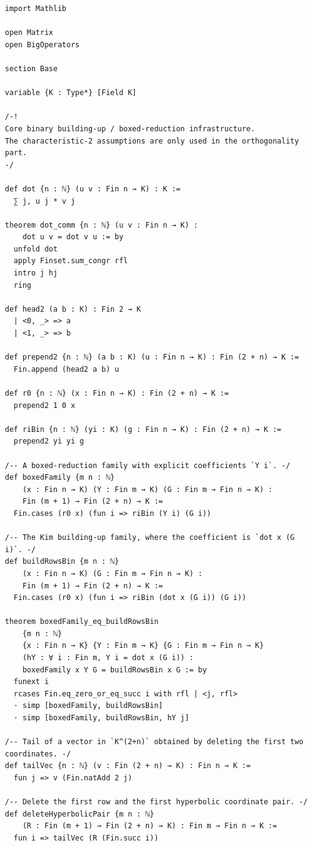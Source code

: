 \documentclass[12pt]{article}
\begin{document}
\begin{lstlisting}[caption={Lean verification for Theorem~\ref{thm:CZ_Kim_Lagrangian}.}]
import Mathlib

open Matrix
open BigOperators

section Base

variable {K : Type*} [Field K]

/-!
Core binary building-up / boxed-reduction infrastructure.
The characteristic-2 assumptions are only used in the orthogonality part.
-/

def dot {n : ℕ} (u v : Fin n → K) : K :=
  ∑ j, u j * v j

theorem dot_comm {n : ℕ} (u v : Fin n → K) :
    dot u v = dot v u := by
  unfold dot
  apply Finset.sum_congr rfl
  intro j hj
  ring

def head2 (a b : K) : Fin 2 → K
  | <0, _> => a
  | <1, _> => b

def prepend2 {n : ℕ} (a b : K) (u : Fin n → K) : Fin (2 + n) → K :=
  Fin.append (head2 a b) u

def r0 {n : ℕ} (x : Fin n → K) : Fin (2 + n) → K :=
  prepend2 1 0 x

def riBin {n : ℕ} (yi : K) (g : Fin n → K) : Fin (2 + n) → K :=
  prepend2 yi yi g

/-- A boxed-reduction family with explicit coefficients `Y i`. -/
def boxedFamily {m n : ℕ}
    (x : Fin n → K) (Y : Fin m → K) (G : Fin m → Fin n → K) :
    Fin (m + 1) → Fin (2 + n) → K :=
  Fin.cases (r0 x) (fun i => riBin (Y i) (G i))

/-- The Kim building-up family, where the coefficient is `dot x (G i)`. -/
def buildRowsBin {m n : ℕ}
    (x : Fin n → K) (G : Fin m → Fin n → K) :
    Fin (m + 1) → Fin (2 + n) → K :=
  Fin.cases (r0 x) (fun i => riBin (dot x (G i)) (G i))

theorem boxedFamily_eq_buildRowsBin
    {m n : ℕ}
    {x : Fin n → K} {Y : Fin m → K} {G : Fin m → Fin n → K}
    (hY : ∀ i : Fin m, Y i = dot x (G i)) :
    boxedFamily x Y G = buildRowsBin x G := by
  funext i
  rcases Fin.eq_zero_or_eq_succ i with rfl | <j, rfl>
  · simp [boxedFamily, buildRowsBin]
  · simp [boxedFamily, buildRowsBin, hY j]

/-- Tail of a vector in `K^(2+n)` obtained by deleting the first two coordinates. -/
def tailVec {n : ℕ} (v : Fin (2 + n) → K) : Fin n → K :=
  fun j => v (Fin.natAdd 2 j)

/-- Delete the first row and the first hyperbolic coordinate pair. -/
def deleteHyperbolicPair {m n : ℕ}
    (R : Fin (m + 1) → Fin (2 + n) → K) : Fin m → Fin n → K :=
  fun i => tailVec (R (Fin.succ i))


\end{lstlisting}
\end{document}
